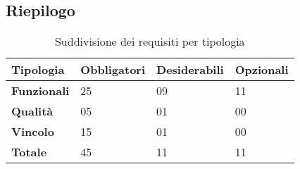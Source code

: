 \subsection{Riepilogo}
\begin{table}[H]
\centering
    \begin{tabular}{|C{3.0cm}|C{2.5cm}|C{2.5cm}|C{2.5cm}|}
        \hline
         \textbf{Tipologia} &
         \textbf{Obbligatori} & 
         \textbf{Desiderabili} &
         \textbf{Opzionali} 
          \\
          \hline
          \textbf{Funzionali} & 25 & 09 & 11 \\
          \hline 
          \textbf{Qualità} & 05 & 01 & 00\\
          \hline
          \textbf{Vincolo} & 15 & 01 & 00\\
          \hline
          \textbf{Totale} & 45 & 11 & 11\\
          \hline
    \end{tabular}
    \caption{Suddivisione dei requisiti per tipologia}
\end{table}
